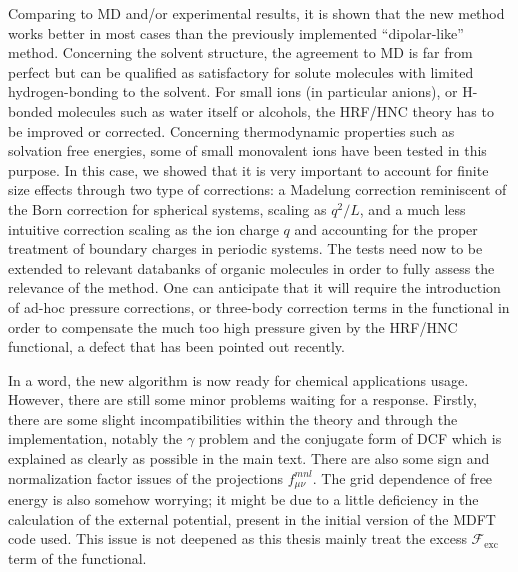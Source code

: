Comparing to \acs{MD} and/or experimental results, it is shown that
the new method works better in most cases than the previously implemented
``dipolar-like'' method. Concerning the solvent structure, the agreement
to \acs{MD} is far from perfect but can be qualified as satisfactory
for solute molecules with limited hydrogen-bonding to the solvent.
For small ions (in particular anions), or H-bonded molecules such
as water itself or alcohols, the \acs{HRF}/\acs{HNC} theory has
to be improved or corrected. Concerning thermodynamic properties such
as solvation free energies, some of small monovalent ions have been
tested in this purpose. In this case, we showed that it is very important
to account for finite size effects through two type of corrections:
a Madelung correction reminiscent of the Born correction for spherical
systems, scaling as $q^{2}/L$, and a much less intuitive correction
scaling as the ion charge $q$ and accounting for the proper treatment
of boundary charges in periodic systems. The tests need now to be
extended to relevant databanks of organic molecules in order to fully
assess the relevance of the method. One can anticipate that it will
require the introduction of ad-hoc pressure corrections, or three-body
correction terms in the functional in order to compensate the much
too high pressure given by the \acs{HRF}/\acs{HNC} functional, a
defect that has been pointed out recently.

In a word, the new algorithm is now ready for chemical applications
usage. However, there are still some minor problems waiting for a
response. Firstly, there are some slight incompatibilities within
the theory and through the implementation, notably the $\gamma$ problem
and the conjugate form of \acs{DCF} which is explained as clearly
as possible in the main text. There are also some sign and normalization
factor issues of the projections $f_{\mu\nu}^{mnl}$. The grid dependence
of free energy is also somehow worrying; it might be due to a little
deficiency in the calculation of the external potential, present in
the initial version of the \acf{MDFT} code used. This issue is not
deepened as this thesis mainly treat the excess $\mathcal{F}_{\mathrm{exc}}$
term of the functional.
